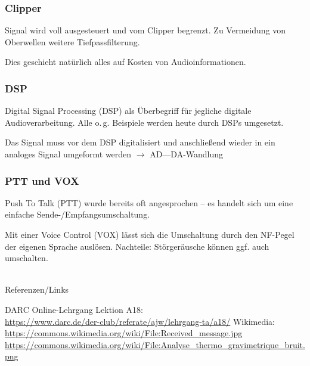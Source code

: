 \begin{frame}
    \frametitle{Clipper}

    Signal wird voll ausgesteuert und vom Clipper begrenzt. Zu Vermeidung von
    Oberwellen weitere Tiefpassfilterung.

    \bigskip

    Dies geschieht natürlich alles auf Kosten von Audioinformationen.

\end{frame}

\begin{frame}
    \frametitle{DSP}

    Digital Signal Processing (DSP) als Überbegriff für jegliche digitale
    Audioverarbeitung. Alle o.\,g. Beispiele werden heute durch DSPs umgesetzt.

    \bigskip

    Das Signal muss vor dem DSP digitalisiert und anschließend wieder in ein
    analoges Signal umgeformt werden $\rightarrow$ AD---DA-Wandlung

\end{frame}

\begin{frame}
    \frametitle{PTT und VOX}

    Push To Talk (PTT) wurde bereits oft angesprochen -- es handelt sich um eine
    einfache Sende-/Empfangsumschaltung.

    \bigskip

    Mit einer Voice Control (VOX) lässt sich die Umschaltung durch den NF-Pegel
    der eigenen Sprache auslösen. Nachteile: Störgeräusche können ggf. auch
    umschalten.

\end{frame}

\renewcommand{\refname}{Referenzen}

\hypertarget{refs}{}
\textcolor{white}{} \\ %
\Large Referenzen/Links
\footnotesize

\begin{thebibliography}{}
      DARC Online-Lehrgang Lektion A18:\\
                    \url{https://www.darc.de/der-club/referate/ajw/lehrgang-ta/a18/}
        Wikimedia:\\
                    \url{https://commons.wikimedia.org/wiki/File:Received_message.jpg}\\
                    \url{https://commons.wikimedia.org/wiki/File:Analyse_thermo_gravimetrique_bruit.png}
\end{thebibliography}


